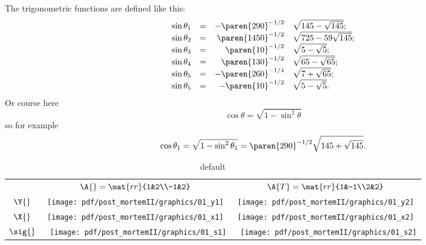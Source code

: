 The trigonometric functions are defined like this:
\begin{equation}
  \begin{array}{rcrl}
    \sin \theta_{1} &=& -\paren{290}^{-1/2}  &\sqrt{145 - \sqrt{145}};\\
    \sin \theta_{2} &=&  \paren{1450}^{-1/2} &\sqrt{725 - 59\sqrt{145}};\\
    \sin \theta_{3} &=&  \paren{10}^{-1/2}   &\sqrt{5 - \sqrt{5}};\\
    \sin \theta_{4} &=&  \paren{130}^{-1/2}  &\sqrt{65 - \sqrt{65}};\\
    \sin \theta_{5} &=& -\paren{260}^{-1/4}  &\sqrt{7 + \sqrt{65}};\\
    \sin \theta_{5} &=& -\paren{10}^{-1/2}   &\sqrt{5 - \sqrt{5}}.
  \end{array}
\end{equation}
Or course here
\begin{equation}
  \cos \theta = \sqrt{1-\sin^{2}\theta}
\end{equation}
so for example
\begin{equation}
  \cos \theta_{1} = \sqrt{1-\sin^{2}\theta_{1}} = \paren{290}^{-1/2} \sqrt{145 + \sqrt{145}}.
\end{equation}

\begin{table}[htdp]
\begin{center}
\begin{tabular}{ccc}
 & $\A{}  = \mat{rr}{1&2\\-1&2}$ 
 & $\A{T} = \mat{rr}{1&-1\\2&2}$ \\[35pt]
 $\Y{}$   & \qquad \texttt{[image: pdf/post\_mortemII/graphics/01\_y1]} 
          & \qquad \texttt{[image: pdf/post\_mortemII/graphics/01\_y2]} \\[15pt]
 $\X{}$   & \qquad \texttt{[image: pdf/post\_mortemII/graphics/01\_x1]}
          & \qquad \texttt{[image: pdf/post\_mortemII/graphics/01\_x2]} \\[20pt]
 $\sig{}$ & \,\,   \texttt{[image: pdf/post\_mortemII/graphics/01\_s1]}
          & \,\,   \texttt{[image: pdf/post\_mortemII/graphics/01\_s2]} \\[20pt]
\end{tabular}
\end{center}
\label{tab:pmII:visualsa}
\caption{default}
\end{table}%
\clearpage

